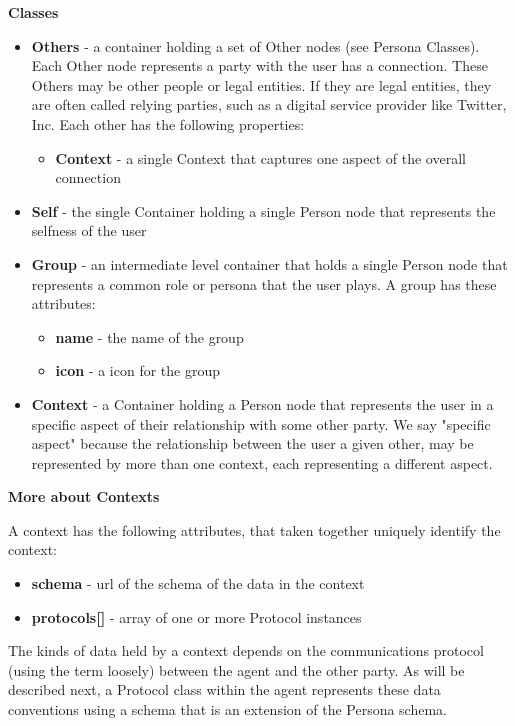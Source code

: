 \documentclass[11pt, oneside]{article}   	%
\begin{document}
\textbf{Classes}

\begin{itemize}
\item \textbf{Others} - a container holding a set of Other nodes (see Persona Classes). Each Other node represents a party with the user has a connection. These Others may be other people or legal entities. If they are legal entities, they are often called relying parties, such as a digital service provider like Twitter, Inc. Each other has the following properties:
	\begin{itemize}
	\item \textbf{Context} - a single Context that captures one aspect of the overall connection
	\end{itemize}
\item \textbf{Self} - the single Container holding a single Person node that represents the selfness of the user
\item \textbf{Group} - an intermediate level container that holds a single Person node that represents a common role or persona that the user plays. A group has these attributes:
	\begin{itemize}
	\item \textbf{name} - the name of the group 
	\item \textbf{icon} - a icon for the group
	\end{itemize}
\item \textbf{Context} - a Container holding a Person node that represents the user in a specific aspect of their relationship with some other party. We say "specific aspect" because the relationship between the user a given other, may be represented by more than one context, each representing a different aspect. 
\end{itemize}

\textbf{More about Contexts}

A context has the following attributes, that taken together uniquely identify the context:

\begin{itemize}
\item \textbf{schema} - url of the schema of the data in the context
\item \textbf{protocols[]} - array of one or more Protocol instances
\end{itemize}

The kinds of data held by a context depends on the communications protocol (using the term loosely) between the agent and the other party. As will be described next, a Protocol class within the agent represents these data conventions using a schema that is an extension of the Persona schema.
\end{document}
